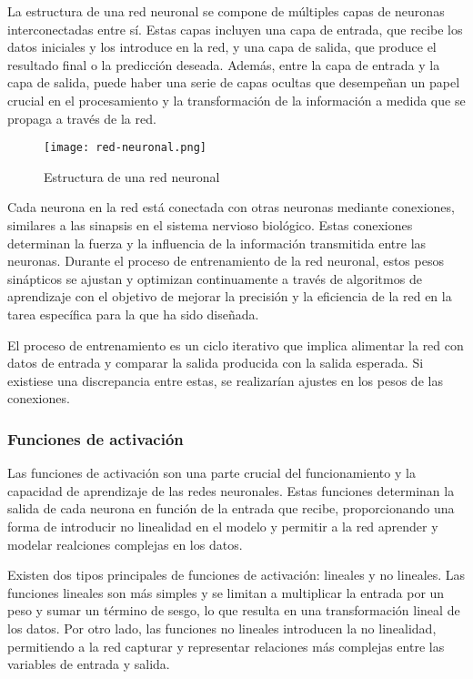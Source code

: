 La estructura de una red neuronal se compone de múltiples capas de neuronas interconectadas entre sí. Estas capas incluyen una capa de entrada, que recibe los datos iniciales y los introduce en la red, y una capa de salida, que produce el resultado final o la predicción deseada. Además, entre la capa de entrada y la capa de salida, puede haber una serie de capas ocultas que desempeñan un papel crucial en el procesamiento y la transformación de la información a medida que se propaga a través de la red.

\begin{figure}[ht]
    \centering
    \texttt{[image: red-neuronal.png]}
    \caption{Estructura de una red neuronal}
    \label{fig:red-neuronal}
\end{figure}

Cada neurona en la red está conectada con otras neuronas mediante conexiones, similares a las sinapsis en el sistema nervioso biológico. Estas conexiones determinan la fuerza y la influencia de la información transmitida entre las neuronas. Durante el proceso de entrenamiento de la red neuronal, estos pesos sinápticos se ajustan y optimizan continuamente a través de algoritmos de aprendizaje con el objetivo de mejorar la precisión y la eficiencia de la red en la tarea específica para la que ha sido diseñada.

El proceso de entrenamiento es un ciclo iterativo que implica alimentar la red con datos de entrada y comparar la salida producida con la salida esperada. Si existiese una discrepancia entre estas, se realizarían ajustes en los pesos de las conexiones.

\subsubsection{Funciones de activación}
Las funciones de activación son una parte crucial del funcionamiento y la capacidad de aprendizaje de las redes neuronales. Estas funciones determinan la salida de cada neurona en función de la entrada que recibe, proporcionando una forma de introducir no linealidad en el modelo y permitir a la red aprender y modelar realciones complejas en los datos.

Existen dos tipos principales de funciones de activación: lineales y no lineales. Las funciones lineales son más simples y se limitan a multiplicar la entrada por un peso y sumar un término de sesgo, lo que resulta en una transformación lineal de los datos. Por otro lado, las funciones no lineales introducen la no linealidad, permitiendo a la red capturar y representar relaciones más complejas entre las variables de entrada y salida.

